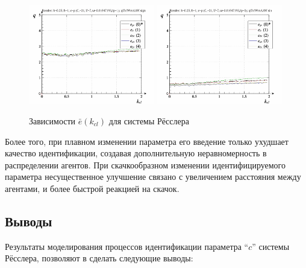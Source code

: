 \begin{figure}[ht!]
\begin{center}
  \includegraphics[width=0.49\textwidth]{p/cha/ross/ross_id-p_k_cl_ql3rlWvnAAW_sign.png}
  \hfill
  \includegraphics[width=0.49\textwidth]{p/cha/ross/ross_id-p_k_cl_ql3rlWvnAAW_sin.png}
\end{center}
  \caption{Зависимости $\bar{e}(k_{cl})$ для системы Рёсслера}
\label{atu:f:ross_e_k_cl}
\end{figure}

Более того, при плавном изменении параметра его введение только ухудшает
качество идентификации, создавая дополнительную неравномерность в распределении
агентов. При скачкообразном изменении идентифицируемого параметра
несущественное улучшение связано с увеличением расстояния между агентами,
и более быстрой реакцией на скачок.






\subsection{Выводы}  %

Результаты моделирования
процессов идентификации параметра ``$c$''
системы Рёсслера,
позволяют в сделать следующие выводы:


